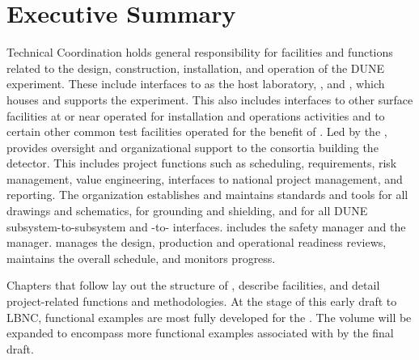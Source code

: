 \chapter{Executive Summary}
\label{vl:tc-execsum}


 Technical Coordination holds general responsibility for
facilities and functions related to the design, construction,
installation, and operation of the DUNE experiment. These
include interfaces to \fnal as the host laboratory, ,
and , which houses and supports the  experiment. This also 
includes interfaces to other surface facilities at or near \surf
operated for installation and operations activities and to certain
other common test facilities operated for the benefit of
. Led by the  , 
 provides oversight and organizational support to the
consortia building the  detector.  This includes project
functions such as scheduling, requirements, risk management, value
engineering, interfaces to national project management, and
reporting. The  organization establishes and maintains
standards and tools for all drawings and schematics, for grounding and
shielding, and for all DUNE subsystem-to-subsystem and
-to- interfaces.   includes the
 safety manager and the  
manager.   manages the design, production and
operational readiness reviews, maintains the overall schedule, and
monitors progress.

Chapters that follow lay out the structure of 
, describe  facilities, and detail
project-related functions and methodologies. At the stage of this
early draft to LBNC,   functional examples are most fully
developed for the  . The volume will be expanded to
encompass more functional examples associated with 
  by the final draft.

